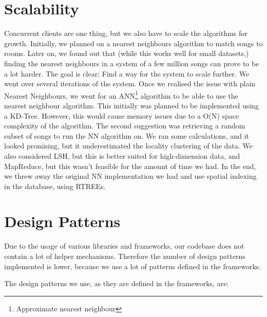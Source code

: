 \section{Scalability}
Concurrent clients are one thing, but we also have to scale the algorithms for growth.
Initially, we planned on a nearest neighbours algorithm to match songs to rooms.
Later on, we found out that (while this works well for small datasets,) finding the nearest neighbours in a system of a few million songs can prove to be a lot harder.
The goal is clear: Find a way for the system to scale further.
We went over several iterations of the system.
Once we realised the issue with plain Nearest Neighbours, we went for an ANN\footnote{Approximate nearest neighbour} algorithm to be able to use the nearest neighbour algorithm.
This initially was planned to be implemented using a \gls{KD-Tree}.
However, this would cause memory issues due to a O(N) space complexity of the algorithm.
The second suggestion was retrieving a random subset of songs to run the NN algorithm on.
We ran some calculations, and it looked promising, but it underestimated the locality clustering of the data. 
We also considered \gls{LSH}, but this is better suited for high-dimension data, and MapReduce, but this wasn't feasible for the amount of time we had.
In the end, we threw away the original NN implementation we had and use spatial indexing in the database, using \gls{RTREE}s.

\section{Design Patterns}

Due to the usage of various libraries and frameworks, our codebase does not contain a lot of helper mechanisms.
Therefore the number of design patterns implemented is lower, because we use a lot of patterns defined in the frameworks.

The design patterns we use, as they are defined in the frameworks, are:

